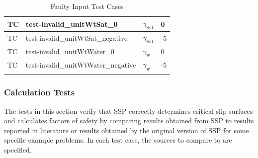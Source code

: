 \documentclass[12pt, titlepage]{article}
\newcounter{testnum} %
\newcommand{\progname}{SSP}
\begin{document}
\begin{longtable}{  l  p{5cm}  l  p{5cm}  }
	\hline
	TC{testnum}\thetestnum \label{TC_InvalidUnitWtSat0} & 
	test-invalid\_unitWtSat\_0 & $\gamma_\text{Sat}$ & 0\\ 
	\hline
	TC{testnum}\thetestnum \label{TC_InvalidUnitWtSatNegative} & 
	test-invalid\_unitWtSat\_negative & $\gamma_\text{Sat}$ & -5\\ 
	\hline
	TC{testnum}\thetestnum \label{TC_InvalidUnitWtWater0} & 
	test-invalid\_unitWtWater\_0 & $\gamma_\text{w}$ & 0\\ 
	\hline
	TC{testnum}\thetestnum \label{TC_InvalidUnitWtWaterNegative} 
	& test-invalid\_unitWtWater\_negative & $\gamma_\text{w}$ & -5\\ 
	\hline
	\caption{Faulty Input Test Cases}
	\label{FaultyInputTests}
\end{longtable}

\subsubsection{Calculation Tests} \label{sec_CalcTCs}

The tests in this section verify that \progname{} correctly determines critical 
slip surfaces and calculates factors of safety by comparing results obtained 
from \progname{} to results reported in literature or results obtained by the 
original version of \progname{} for some specific example problems. In each 
test case, the sources to compare to are specified.
\end{document}
